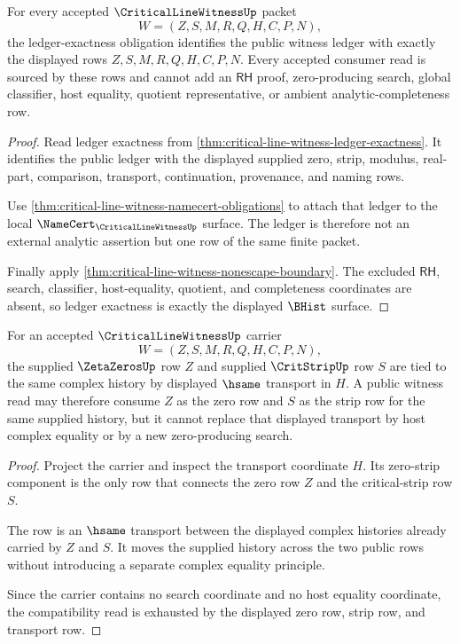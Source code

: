 \begin{theorem}
\label{thm:critical-line-witness-obligation-ledger-exactness-row}
For every accepted $\CriticalLineWitnessUp$ packet
$$
W=(Z,S,M,R,Q,H,C,P,N),
$$
the ledger-exactness obligation identifies the public witness ledger with exactly the displayed rows $Z,S,M,R,Q,H,C,P,N$. Every accepted consumer read is sourced by these rows and cannot add an $\mathsf{RH}$ proof, zero-producing search, global classifier, host equality, quotient representative, or ambient analytic-completeness row.
\end{theorem}
\begin{proof}
Read ledger exactness from \autoref{thm:critical-line-witness-ledger-exactness}. It identifies the public ledger with the displayed supplied zero, strip, modulus, real-part, comparison, transport, continuation, provenance, and naming rows.

Use \autoref{thm:critical-line-witness-namecert-obligations} to attach that ledger to the local $\NameCert_{\CriticalLineWitnessUp}$ surface. The ledger is therefore not an external analytic assertion but one row of the same finite packet.

Finally apply \autoref{thm:critical-line-witness-nonescape-boundary}. The excluded $\mathsf{RH}$, search, classifier, host-equality, quotient, and completeness coordinates are absent, so ledger exactness is exactly the displayed $\BHist$ surface.
\end{proof}

\begin{theorem}
\label{thm:critical-line-witness-strip-zero-compatibility}
For an accepted $\CriticalLineWitnessUp$ carrier
$$
W=(Z,S,M,R,Q,H,C,P,N),
$$
the supplied $\ZetaZerosUp$ row $Z$ and supplied $\CritStripUp$ row $S$ are tied to the same complex history by displayed $\hsame$ transport in $H$. A public witness read may therefore consume $Z$ as the zero row and $S$ as the strip row for the same supplied history, but it cannot replace that displayed transport by host complex equality or by a new zero-producing search.
\end{theorem}
\begin{proof}
Project the carrier and inspect the transport coordinate $H$. Its zero-strip component is the only row that connects the zero row $Z$ and the critical-strip row $S$.

The row is an $\hsame$ transport between the displayed complex histories already carried by $Z$ and $S$. It moves the supplied history across the two public rows without introducing a separate complex equality principle.

Since the carrier contains no search coordinate and no host equality coordinate, the compatibility read is exhausted by the displayed zero row, strip row, and transport row.
\end{proof}

